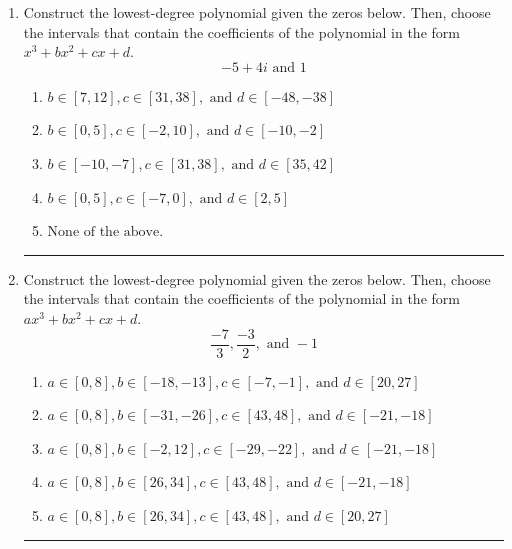 \documentclass[14pt]{extbook}
\newcommand{\litem}[1]{\item#1\hspace*{-1cm}\rule{\textwidth}{0.4pt}}
\begin{document}
\begin{enumerate}
\litem{
Construct the lowest-degree polynomial given the zeros below. Then, choose the intervals that contain the coefficients of the polynomial in the form $x^3+bx^2+cx+d$.\[ -5 + 4 i \text{ and } 1 \]\begin{enumerate}[label=\Alph*.]
\item \( b \in [7, 12], c \in [31, 38], \text{ and } d \in [-48, -38] \)
\item \( b \in [0, 5], c \in [-2, 10], \text{ and } d \in [-10, -2] \)
\item \( b \in [-10, -7], c \in [31, 38], \text{ and } d \in [35, 42] \)
\item \( b \in [0, 5], c \in [-7, 0], \text{ and } d \in [2, 5] \)
\item \( \text{None of the above.} \)

\end{enumerate} }
\litem{
Construct the lowest-degree polynomial given the zeros below. Then, choose the intervals that contain the coefficients of the polynomial in the form $ax^3+bx^2+cx+d$.\[ \frac{-7}{3}, \frac{-3}{2}, \text{ and } -1 \]\begin{enumerate}[label=\Alph*.]
\item \( a \in [0, 8], b \in [-18, -13], c \in [-7, -1], \text{ and } d \in [20, 27] \)
\item \( a \in [0, 8], b \in [-31, -26], c \in [43, 48], \text{ and } d \in [-21, -18] \)
\item \( a \in [0, 8], b \in [-2, 12], c \in [-29, -22], \text{ and } d \in [-21, -18] \)
\item \( a \in [0, 8], b \in [26, 34], c \in [43, 48], \text{ and } d \in [-21, -18] \)
\item \( a \in [0, 8], b \in [26, 34], c \in [43, 48], \text{ and } d \in [20, 27] \)


\end{enumerate}}
\end{enumerate}
\end{document}
